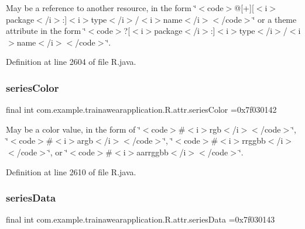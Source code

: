 May be a reference to another resource, in the form \char`\"{}$<$code$>$@\mbox{[}+\mbox{]}\mbox{[}$<$i$>$package$<$/i$>$\+:\mbox{]}$<$i$>$type$<$/i$>$/$<$i$>$name$<$/i$>$$<$/code$>$\char`\"{} or a theme attribute in the form \char`\"{}$<$code$>$?\mbox{[}$<$i$>$package$<$/i$>$\+:\mbox{]}$<$i$>$type$<$/i$>$/$<$i$>$name$<$/i$>$$<$/code$>$\char`\"{}. 

Definition at line 2604 of file R.\+java.

\mbox{\label{classcom_1_1example_1_1trainawearapplication_1_1_r_1_1attr_afd61c562031d13f64b319ab485a383a3}} 
\subsubsection{\texorpdfstring{seriesColor}{seriesColor}}
{\footnotesize\ttfamily final int com.\+example.\+trainawearapplication.\+R.\+attr.\+series\+Color =0x7f030142\hspace{0.3cm}{\ttfamily [static]}}

May be a color value, in the form of \char`\"{}$<$code$>$\#$<$i$>$rgb$<$/i$>$$<$/code$>$\char`\"{}, \char`\"{}$<$code$>$\#$<$i$>$argb$<$/i$>$$<$/code$>$\char`\"{}, \char`\"{}$<$code$>$\#$<$i$>$rrggbb$<$/i$>$$<$/code$>$\char`\"{}, or \char`\"{}$<$code$>$\#$<$i$>$aarrggbb$<$/i$>$$<$/code$>$\char`\"{}. 

Definition at line 2610 of file R.\+java.

\mbox{\label{classcom_1_1example_1_1trainawearapplication_1_1_r_1_1attr_a788cc2e11455a49624bb42633d8feddf}} 
\subsubsection{\texorpdfstring{seriesData}{seriesData}}
{\footnotesize\ttfamily final int com.\+example.\+trainawearapplication.\+R.\+attr.\+series\+Data =0x7f030143\hspace{0.3cm}{\ttfamily [static]}}

